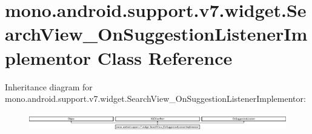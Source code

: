 \hypertarget{classmono_1_1android_1_1support_1_1v7_1_1widget_1_1SearchView__OnSuggestionListenerImplementor}{}\section{mono.\+android.\+support.\+v7.\+widget.\+Search\+View\+\_\+\+On\+Suggestion\+Listener\+Implementor Class Reference}
\label{classmono_1_1android_1_1support_1_1v7_1_1widget_1_1SearchView__OnSuggestionListenerImplementor}
Inheritance diagram for mono.\+android.\+support.\+v7.\+widget.\+Search\+View\+\_\+\+On\+Suggestion\+Listener\+Implementor\+:\begin{figure}[H]
\begin{center}
\leavevmode
\includegraphics[height=0.790960cm]{classmono_1_1android_1_1support_1_1v7_1_1widget_1_1SearchView__OnSuggestionListenerImplementor}
\end{center}
\end{figure}
